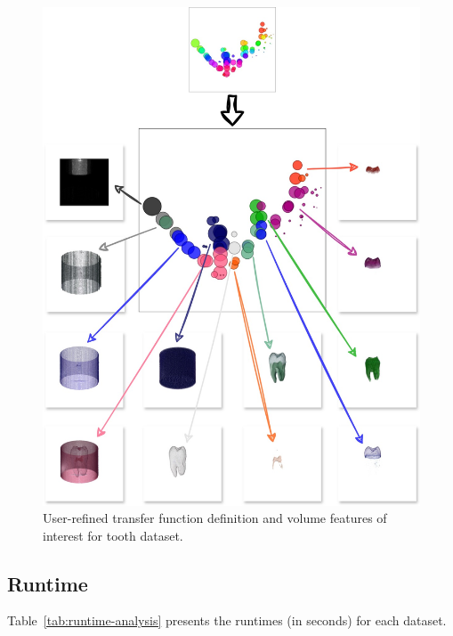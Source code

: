 \begin{figure}[htb!]
    \centering
    \includegraphics[width=\columnwidth]{figs/tooth-groups.jpg}
    \caption{User-refined transfer function definition and volume features of interest for tooth dataset.}
    \label{fig:tooth-groups}
\end{figure}


\subsection{Runtime}
\label{subsect:runtime-analysis}

Table~\ref{tab:runtime-analysis} presents the runtimes (in seconds) for each dataset.

